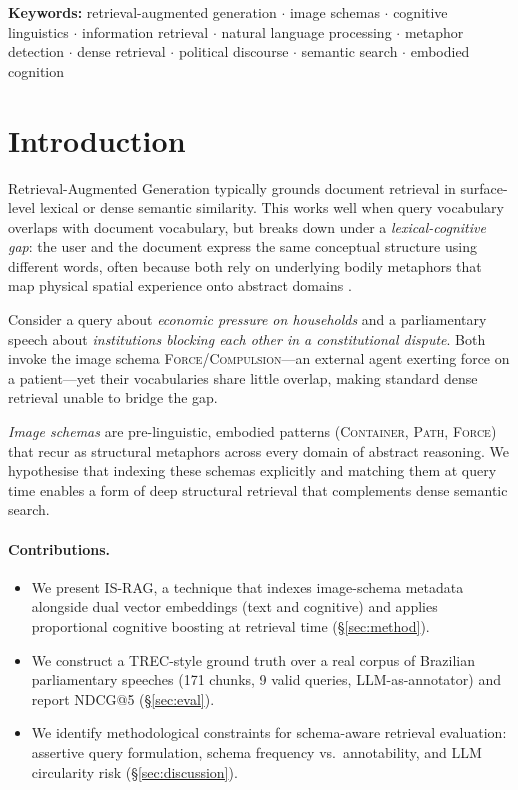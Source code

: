 \documentclass[11pt,a4paper]{article}
\begin{document}
\noindent\textbf{Keywords:} retrieval-augmented generation $\cdot$ image schemas $\cdot$ cognitive linguistics $\cdot$ information retrieval $\cdot$ natural language processing $\cdot$ metaphor detection $\cdot$ dense retrieval $\cdot$ political discourse $\cdot$ semantic search $\cdot$ embodied cognition

\section{Introduction}
\label{sec:intro}

Retrieval-Augmented Generation \citep{lewis2020rag} typically grounds
document retrieval in surface-level lexical or dense semantic
similarity.
This works well when query vocabulary overlaps with document
vocabulary, but breaks down under a \emph{lexical-cognitive gap}: the
user and the document express the same conceptual structure using
different words, often because both rely on underlying bodily
metaphors that map physical spatial experience onto abstract domains
\citep{johnson1987,lakoff1980}.

Consider a query about \emph{economic pressure on households} and a
parliamentary speech about \emph{institutions blocking each other in a
constitutional dispute}. Both invoke the image schema
\textsc{Force}/\textsc{Compulsion}—an external agent exerting force on
a patient—yet their vocabularies share little overlap, making standard
dense retrieval unable to bridge the gap.

\emph{Image schemas} \citep{johnson1987,feldman2006} are
pre-linguistic, embodied patterns (\textsc{Container}, \textsc{Path},
\textsc{Force}) that recur as structural metaphors across every domain
of abstract reasoning.
We hypothesise that indexing these schemas explicitly and matching them
at query time enables a form of deep structural retrieval that
complements dense semantic search.

\paragraph{Contributions.}
\begin{itemize}[noitemsep,topsep=2pt]
  \item We present IS-RAG, a technique that indexes image-schema
        metadata alongside dual vector embeddings (text and cognitive)
        and applies proportional cognitive boosting at retrieval time
        (\S\ref{sec:method}).
  \item We construct a TREC-style ground truth over a real corpus of
        Brazilian parliamentary speeches (171 chunks, 9 valid queries,
        LLM-as-annotator) and report NDCG@5 (\S\ref{sec:eval}).
  \item We identify methodological constraints for schema-aware
        retrieval evaluation: assertive query formulation, schema
        frequency vs.\ annotability, and LLM circularity risk
        (\S\ref{sec:discussion}).
\end{itemize}
\end{document}
